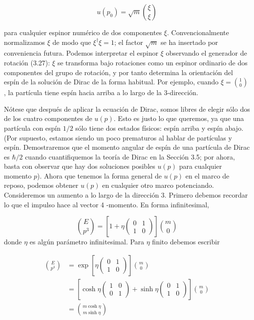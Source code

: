 \begin{equation*}
u\left(p_{0}\right)=\sqrt{m}\binom{\xi}{\xi} \tag{3.47}
\end{equation*}

para cualquier espinor numérico de dos componentes $\xi$. Convencionalmente normalizamos $\xi$ de modo que $\xi^{\dagger} \xi=1$; el factor $\sqrt{m}$ se ha insertado por conveniencia futura. Podemos interpretar el espinor $\xi$ observando el generador de rotación (3.27): $\xi$ se transforma bajo rotaciones como un espinor ordinario de dos componentes del grupo de rotación, y por tanto determina la orientación del espín de la solución de Dirac de la forma habitual. Por ejemplo, cuando $\xi=\binom{1}{0}$, la partícula tiene espín hacia arriba a lo largo de la 3-dirección.



Nótese que después de aplicar la ecuación de Dirac, somos libres de elegir sólo dos de los cuatro componentes de $u(p)$. Esto es justo lo que queremos, ya que una partícula con espín $1 / 2$ sólo tiene dos estados físicos: espín arriba y espín abajo. (Por supuesto, estamos siendo un poco prematuros al hablar de partículas y espín. Demostraremos que el momento angular de espín de una partícula de Dirac es $\hbar / 2$ cuando cuantifiquemos la teoría de Dirac en la Sección 3.5; por ahora, basta con observar que hay dos soluciones posibles $u(p)$ para cualquier momento $p$). Ahora que tenemos la forma general de $u(p)$ en el marco de reposo, podemos obtener $u(p)$ en cualquier otro marco potenciando. Consideremos un aumento a lo largo de la dirección 3. Primero debemos recordar lo que el impulso hace al vector 4 -momento. En forma infinitesimal,


$$
\binom{E}{p^{3}}=\left[1+\eta\left(\begin{array}{ll}
0 & 1 \\
1 & 0
\end{array}\right)\right]\binom{m}{0}
$$
donde $\eta$ es algún parámetro infinitesimal. Para $\eta$ finito debemos escribir

\begin{align*}
\binom{E}{p^{3}} & =\exp \left[\eta\left(\begin{array}{ll}
0 & 1 \\
1 & 0
\end{array}\right)\right]\binom{m}{0} \\
& =\left[\cosh \eta\left(\begin{array}{ll}
1 & 0 \\
0 & 1
\end{array}\right)+\sinh \eta\left(\begin{array}{ll}
0 & 1 \\
1 & 0
\end{array}\right)\right]\binom{m}{0}  \tag{3.48}\\
& =\binom{m \cosh \eta}{m \sinh \eta}
\end{align*}


